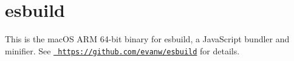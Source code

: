 \chapter{esbuild}
\hypertarget{md_node__modules_2_0desbuild_2darwin-arm64_2_r_e_a_d_m_e}{}\label{md_node__modules_2_0desbuild_2darwin-arm64_2_r_e_a_d_m_e}
\label{md_node__modules_2_0desbuild_2darwin-arm64_2_r_e_a_d_m_e_autotoc_md0}%
%
 This is the mac\+OS ARM 64-\/bit binary for esbuild, a Java\+Script bundler and minifier. See \href{https://github.com/evanw/esbuild}{\texttt{ https\+://github.\+com/evanw/esbuild}} for details. 